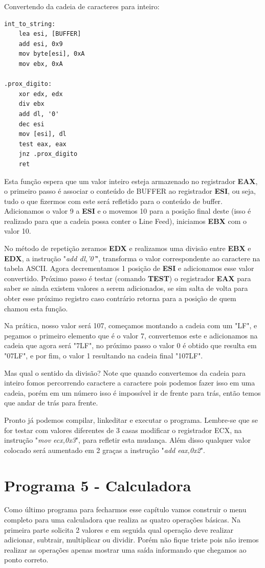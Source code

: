 Convertendo da cadeia de caracteres para inteiro:
\begin{lstlisting}[]
int_to_string:
	lea esi, [BUFFER]
	add esi, 0x9
	mov byte[esi], 0xA
	mov ebx, 0xA

.prox_digito:
	xor edx, edx
	div ebx
	add dl, '0'
	dec esi
	mov [esi], dl
	test eax, eax
	jnz .prox_digito
	ret
\end{lstlisting}

Esta função espera que um valor inteiro esteja armazenado no registrador \textbf{EAX}, o primeiro passo é associar o conteúdo de BUFFER ao registrador \textbf{ESI}, ou seja, tudo o que fizermos com este será refletido para o conteúdo de buffer. Adicionamos o valor 9 a \textbf{ESI} e o movemos 10 para a posição final deste (isso é realizado para que a cadeia possa conter o Line Feed), iniciamos \textbf{EBX} com o valor 10.

No método de repetição zeramos \textbf{EDX} e realizamos uma divisão entre \textbf{EBX} e \textbf{EDX}, a instrução "\textit{add dl,'0'}", transforma o valor correspondente ao caractere na tabela ASCII. Agora decrementamos 1 posição de \textbf{ESI} e adicionamos esse valor convertido. Próximo passo é testar (comando \textbf{TEST}) o registrador \textbf{EAX} para saber se ainda existem valores a serem adicionados, se sim salta de volta para obter esse próximo registro caso contrário retorna para a posição de quem chamou esta função.

Na prática, nosso valor será 107, começamos montando a cadeia com um "LF", e pegamos o primeiro elemento que é o valor 7, convertemos este e adicionamos na cadeia que agora será "7LF", no próximo passo o valor 0 é obtido que resulta em "07LF", e por fim, o valor 1 resultando na cadeia final "107LF".

Mas qual o sentido da divisão? Note que quando convertemos da cadeia para inteiro fomos percorrendo caractere a caractere pois podemos fazer isso em uma cadeia, porém em um número isso é impossível ir de frente para trás, então temos que andar de trás para frente.

Pronto já podemos compilar, linkeditar e executar o programa. Lembre-se que se for testar com valores diferentes de 3 casas modificar o registrador ECX, na instrução "\textit{mov ecx,0x3}", para refletir esta mudança. Além disso qualquer valor colocado será aumentado em 2 graças a instrução "\textit{add eax,0x2}".

\section{Programa 5 - Calculadora}
Como último programa para fecharmos esse capítulo vamos construir o menu completo para uma calculadora que realiza as quatro operações básicas. Na primeira parte solicita 2 valores e em seguida qual operação deve realizar adicionar, subtrair, multiplicar ou dividir. Porém não fique triste pois não iremos realizar as operações apenas mostrar uma saída informando que chegamos ao ponto correto.

